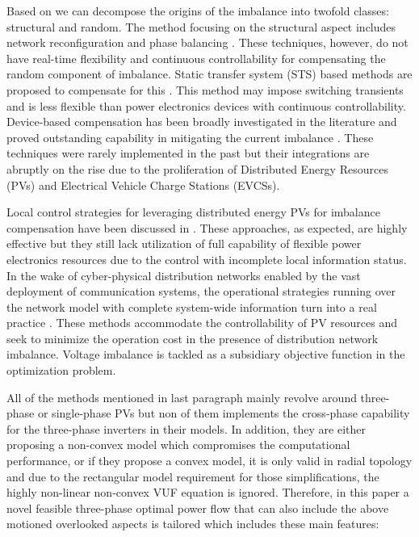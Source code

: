 \documentclass[journal]{IEEEtran}
\begin{document}
  Based on \cite{kong2017three} we can decompose the origins of the imbalance into twofold classes: structural and random. The method focusing on the structural aspect includes network reconfiguration \cite{borozan1997,  morton2000efficient, dall2014sparsity, ding2015feeder, fu2018toward} and phase balancing \cite{zhu1998phase, chen1999optimal, siti2007reconfiguration}. These techniques, however, do not have real-time flexibility and continuous controllability for compensating the random component of imbalance. Static transfer system (STS) based methods are proposed to compensate for this \cite{ding2018per}. This method may impose switching transients and is less flexible than power electronics devices with continuous controllability. Device-based compensation has been broadly investigated in the literature and proved outstanding capability in mitigating the current imbalance \cite{valderrama2001reactive, pires2004unbalanced, salmeron2004compensation, xu2007voltage}. These techniques were rarely implemented in the past but their integrations are abruptly on the rise due to the proliferation of Distributed Energy Resources (PVs) and Electrical Vehicle Charge Stations (EVCSs).
  
Local control strategies for leveraging distributed energy PVs for imbalance compensation have been discussed in \cite{singh2010grid, weckx2015load}. These approaches, as expected, are highly effective but they still lack utilization of full capability of flexible power electronics resources due to the control with incomplete local information status. In the wake of cyber-physical distribution networks enabled by the vast deployment of communication systems, the operational strategies running over the network model with complete system-wide information turn into a real practice \cite{dall2012optimization, robbins2015optimal, araujo2013three, su2014optimal, nguyen2018exact, sheshyekani2019participation}. These methods accommodate the controllability of PV resources and seek to minimize the operation cost in the presence of distribution network imbalance. Voltage imbalance is tackled as a subsidiary objective function in the optimization problem. 

All of the methods mentioned in last paragraph mainly revolve around three-phase or single-phase PVs but non of them implements the cross-phase capability for the three-phase inverters in their models. In addition, they are either proposing a non-convex model which compromises the computational performance, or if they propose a convex model, it is only valid in radial topology and due to the rectangular model requirement for those simplifications, the highly non-linear non-convex VUF equation is ignored. Therefore, in this paper a novel feasible three-phase optimal power flow that can also include the above motioned overlooked aspects is tailored which includes these main features:
\end{document}
